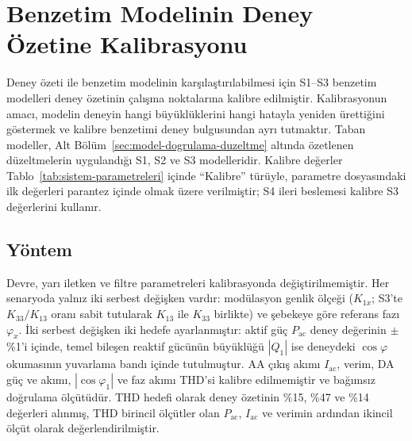 \section{Benzetim Modelinin Deney Özetine Kalibrasyonu}
\label{sec:kalibrasyon}

Deney özeti ile benzetim modelinin karşılaştırılabilmesi için S1--S3 benzetim modelleri deney özetinin çalışma noktalarına kalibre edilmiştir. Kalibrasyonun amacı, modelin deneyin hangi büyüklüklerini hangi hatayla yeniden ürettiğini göstermek ve kalibre benzetimi deney bulgusundan ayrı tutmaktır. Taban modeller, Alt Bölüm~\ref{sec:model-dogrulama-duzeltme} altında özetlenen düzeltmelerin uygulandığı S1, S2 ve S3 modelleridir. Kalibre değerler Tablo~\ref{tab:sistem-parametreleri} içinde ``Kalibre'' türüyle, parametre dosyasındaki ilk değerleri parantez içinde olmak üzere verilmiştir; S4 ileri beslemesi kalibre S3 değerlerini kullanır.

\subsection{Yöntem}

Devre, yarı iletken ve filtre parametreleri kalibrasyonda değiştirilmemiştir. Her senaryoda yalnız iki serbest değişken vardır: modülasyon genlik ölçeği ($K_{1x}$; S3'te $K_{33}/K_{13}$ oranı sabit tutularak $K_{13}$ ile $K_{33}$ birlikte) ve şebekeye göre referans fazı $\varphi_x$. İki serbest değişken iki hedefe ayarlanmıştır: aktif güç $P_{\mathrm{ac}}$ deney değerinin $\pm$\%1'i içinde, temel bileşen reaktif gücünün büyüklüğü $|Q_1|$ ise deneydeki $\cos\varphi$ okumasının yuvarlama bandı içinde tutulmuştur. AA çıkış akımı $I_{\mathrm{ac}}$, verim, DA güç ve akımı, $|\cos\varphi_1|$ ve faz akımı THD'si kalibre edilmemiştir ve bağımsız doğrulama ölçütüdür. THD hedefi olarak deney özetinin \%15, \%47 ve \%14 değerleri alınmış, THD birincil ölçütler olan $P_{\mathrm{ac}}$, $I_{\mathrm{ac}}$ ve verimin ardından ikincil ölçüt olarak değerlendirilmiştir.


